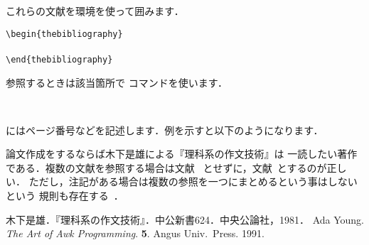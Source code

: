 \begin{Syntax}
  
\end{Syntax}

これらの文献を環境を使って囲みます．
\begin{Syntax}
\verb|\begin{thebibliography}|\\
  \\
\verb|\end{thebibliography}|
\end{Syntax}
%

参照するときは該当箇所で コマンドを使います．
\begin{Syntax}
 \string~
\end{Syntax}

にはページ番号などを記述します．例を示すと以下のようになります．

\begin{InText}
論文作成をするならば木下是雄による『理科系の作文技術』\cite{KK1981}は
一読したい著作である．複数の文献を参照する場合は文献~\cite{KK1981}
\cite{AY1991}とせずに，文献~\cite{KK1981,AY1991}とするのが正しい．
ただし，注記がある場合は複数の参照を一つにまとめるという事はしないという
規則も存在する~\cite[Chapter.~8]{KK1981}\cite[pp.80--89]{AY1991}．
\begin{thebibliography}{9}
	木下是雄．『理科系の作文技術』．中公新書624．中央公論社，1981．
 Ada Young. \emph{The Art of Awk Programming}. 
      \textbf{5}. Angus Univ.~Press. 1991.
\end{thebibliography}
\end{InText}


